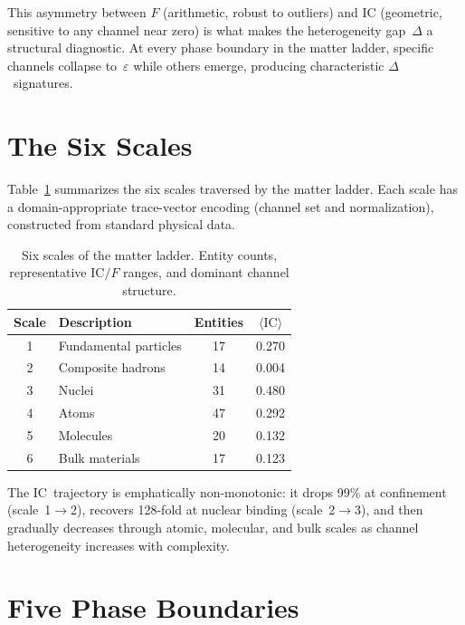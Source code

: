 \documentclass[
  aps,
  prd,
  twocolumn,
  superscriptaddress,
  nofootinbib,
  floatfix
]{revtex4-2}
\newcommand{\eps}{\varepsilon}
\newcommand{\IC}{\mathrm{IC}}
\begin{document}
This asymmetry between $F$ (arithmetic, robust to outliers)
and $\IC$ (geometric, sensitive to any channel near zero) is
what makes the heterogeneity gap~$\Delta$ a structural
diagnostic.  At every phase boundary in the matter ladder,
specific channels collapse to~$\eps$ while others emerge,
producing characteristic $\Delta$~signatures.

\section{The Six Scales}\label{sec:scales}

Table~\ref{tab:scales} summarizes the six scales traversed
by the matter ladder.  Each scale has a domain-appropriate
trace-vector encoding (channel set and normalization),
constructed from standard physical data.

\begin{table}[h]
\caption{\label{tab:scales}Six scales of the matter ladder.
Entity counts, representative $\IC/F$ ranges, and dominant
channel structure.}
\begin{ruledtabular}
\begin{tabular}{clcc}
Scale & Description & Entities & $\langle\IC\rangle$ \\
\hline
1 & Fundamental particles & 17 & 0.270 \\
2 & Composite hadrons & 14 & 0.004 \\
3 & Nuclei & 31 & 0.480 \\
4 & Atoms & 47 & 0.292 \\
5 & Molecules & 20 & 0.132 \\
6 & Bulk materials & 17 & 0.123 \\
\end{tabular}
\end{ruledtabular}
\end{table}

The $\IC$~trajectory is emphatically non-monotonic: it drops
99\% at confinement (scale~1$\to$2), recovers 128-fold at
nuclear binding (scale~2$\to$3), and then gradually decreases
through atomic, molecular, and bulk scales as channel
heterogeneity increases with complexity.

\section{Five Phase Boundaries}\label{sec:boundaries}
\end{document}

